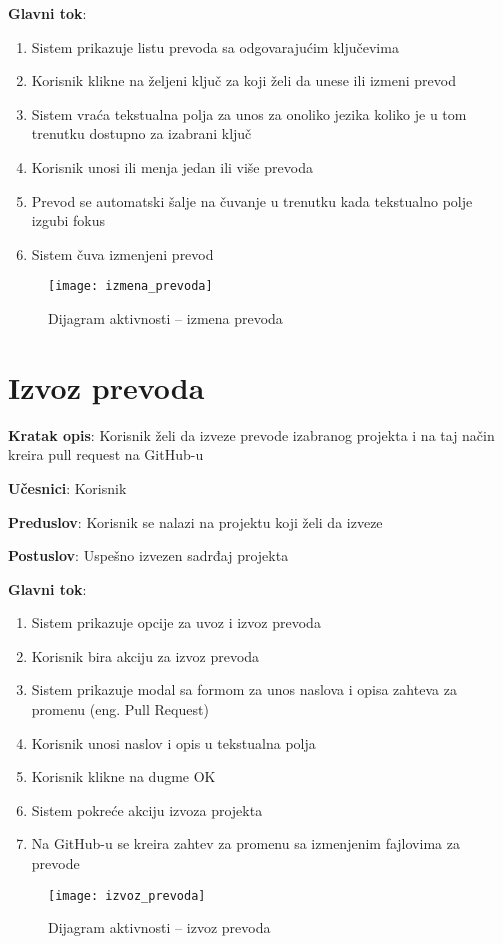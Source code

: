 \textbf{Glavni tok}:
\begin{enumerate}
    \item Sistem prikazuje listu prevoda sa odgovarajućim ključevima
    \item Korisnik klikne na željeni ključ za koji želi da unese ili izmeni prevod
    \item Sistem vraća tekstualna polja za unos za onoliko jezika koliko je u tom 
    trenutku dostupno za izabrani ključ
    \item Korisnik unosi ili menja jedan ili više prevoda
    \item Prevod se automatski šalje na čuvanje u trenutku kada tekstualno polje izgubi fokus
    \item Sistem čuva izmenjeni prevod
\end{enumerate}

\begin{figure}[H]
    \centering
    \texttt{[image: izmena\_prevoda]}
    \caption{Dijagram aktivnosti -- izmena prevoda}
\end{figure}


\section{Izvoz prevoda}

\textbf{Kratak opis}: Korisnik želi da izveze prevode izabranog projekta i 
na taj način kreira pull request na GitHub-u

\textbf{Učesnici}: Korisnik

\textbf{Preduslov}: Korisnik se nalazi na projektu koji želi da izveze

\textbf{Postuslov}: Uspešno izvezen sadrđaj projekta

\textbf{Glavni tok}:
\begin{enumerate}
    \item Sistem prikazuje opcije za uvoz i izvoz prevoda
    \item Korisnik bira akciju za izvoz prevoda
    \item Sistem prikazuje modal sa formom za unos naslova i opisa 
    zahteva za promenu (eng. Pull Request)
    \item Korisnik unosi naslov i opis u tekstualna polja
    \item Korisnik klikne na dugme OK
    \item Sistem pokreće akciju izvoza projekta
    \item Na GitHub-u se kreira zahtev za promenu sa izmenjenim fajlovima za prevode
\end{enumerate}

\begin{figure}[H]
    \centering
    \texttt{[image: izvoz\_prevoda]}
    \caption{Dijagram aktivnosti -- izvoz prevoda}
\end{figure}
